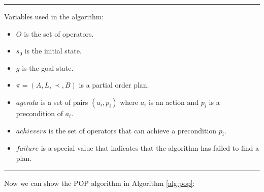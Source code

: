 \hrule
Variables used in the algorithm:
\begin{itemize}
  \item \textbf{$O$} is the set of operators.
  \item \textbf{$s_0$} is the initial state.
  \item \textbf{$g$} is the goal state.
  \item \textbf{$\pi = (A, L, \prec, B)$} is a partial order plan.
  \item \textbf{$agenda$} is a set of pairs $(a_i, p_i)$ where $a_i$ is an action and $p_i$ is a precondition of $a_i$.
  \item \textbf{$achievers$} is the set of operators that can achieve a precondition $p_i$.
  \item \textbf{$failure$} is a special value that indicates that the algorithm has failed to find a plan.
\end{itemize}
\hrule
Now we can show the \ac{POP} algorithm in Algorithm \ref{alg:pop}:

